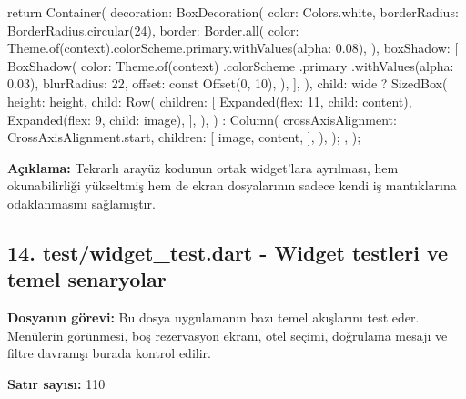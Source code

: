 \documentclass[11pt,a4paper]{article}
\begin{document}
\begin{codeblock}
{{{        return Container(
          decoration: BoxDecoration(
            color: Colors.white,
            borderRadius: BorderRadius.circular(24),
            border: Border.all(
              color:
                  Theme.of(context).colorScheme.primary.withValues(alpha: 0.08),
            ),
            boxShadow: [
              BoxShadow(
                color: Theme.of(context)
                    .colorScheme
                    .primary
                    .withValues(alpha: 0.03),
                blurRadius: 22,
                offset: const Offset(0, 10),
              ),
            ],
          ),
          child: wide
              ? SizedBox(
                  height: height,
                  child: Row(
                    children: [
                      Expanded(flex: 11, child: content),
                      Expanded(flex: 9, child: image),
                    ],
                  ),
                )
              : Column(
                  crossAxisAlignment: CrossAxisAlignment.start,
                  children: [
                    image,
                    content,
                  ],
                ),
        );
      },
    );
  }
}
\end{codeblock}

\textbf{Açıklama:} Tekrarlı arayüz kodunun ortak widget'lara ayrılması, hem okunabilirliği yükseltmiş hem de ekran dosyalarının sadece kendi iş mantıklarına odaklanmasını sağlamıştır.

\clearpage
\subsection{14. test/widget\_test.dart - Widget testleri ve temel senaryolar}
\textbf{Dosyanın görevi:} Bu dosya uygulamanın bazı temel akışlarını test eder. Menülerin görünmesi, boş rezervasyon ekranı, otel seçimi, doğrulama mesajı ve filtre davranışı burada kontrol edilir.

\textbf{Satır sayısı:} 110
\end{document}
